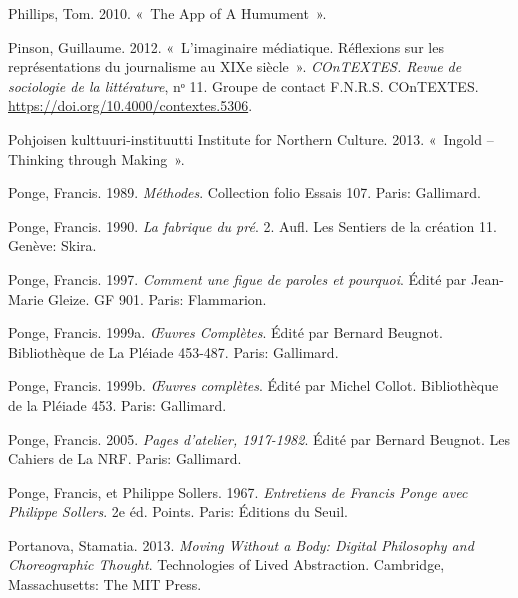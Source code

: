 \begin{CSLReferences}{1}{0}
\leavevmode{}%
Phillips, Tom. 2010. {«~The {App} of {A Humument}~»}.

\leavevmode{}%
Pinson, Guillaume. 2012. {«~{L'imaginaire m{é}diatique. R{é}flexions sur
les repr{é}sentations du journalisme au XIXe si{è}cle}~»}.
\emph{COnTEXTES. Revue de sociologie de la litt{é}rature}, nᵒ 11.
{Groupe de contact F.N.R.S. COnTEXTES}.
\url{https://doi.org/10.4000/contextes.5306}.

\leavevmode{}%
Pohjoisen kulttuuri-instituutti Institute for Northern Culture. 2013.
{«~Ingold -- {Thinking} through {Making}~»}.

\leavevmode{}%
Ponge, Francis. 1989. \emph{{M{é}thodes}}. {Collection folio Essais}
107. {Paris}: {Gallimard}.

\leavevmode{}%
Ponge, Francis. 1990. \emph{{La fabrique du pr{é}}}. 2. Aufl. {Les
Sentiers de la cr{é}ation} 11. {Gen{è}ve}: {Skira}.

\leavevmode{}%
Ponge, Francis. 1997. \emph{{Comment une figue de paroles et pourquoi}}.
Édité par Jean-Marie Gleize. {GF} 901. {Paris}: {Flammarion}.

\leavevmode{}%
Ponge, Francis. 1999a. \emph{{Œ}uvres Compl{è}tes}. Édité par Bernard
Beugnot. Biblioth{è}que de La {Pl{é}iade} 453-487. {Paris}: {Gallimard}.

\leavevmode{}%
Ponge, Francis. 1999b. \emph{{{Œ}uvres compl{è}tes}}. Édité par Michel
Collot. {Biblioth{è}que de la Pl{é}iade} 453. {Paris}: {Gallimard}.

\leavevmode{}%
Ponge, Francis. 2005. \emph{Pages d'atelier, 1917-1982}. Édité par
Bernard Beugnot. Les Cahiers de La {NRF}. {Paris}: {Gallimard}.

\leavevmode{}%
Ponge, Francis, et Philippe Sollers. 1967. \emph{{Entretiens de Francis
Ponge avec Philippe Sollers}}. 2e {é}d. {Points}. {Paris}: {{É}ditions
du Seuil}.

\leavevmode{}%
Portanova, Stamatia. 2013. \emph{Moving {Without} a {Body}: {Digital
Philosophy} and {Choreographic Thought}}. Technologies of Lived
Abstraction. {Cambridge, Massachusetts}: {The MIT Press}.


\end{CSLReferences}
